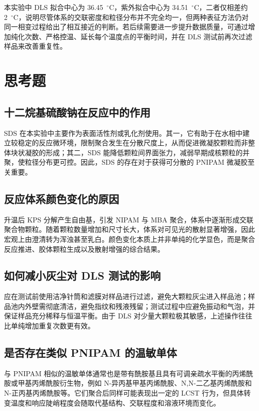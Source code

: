 \documentclass[a4paper]{article}
\begin{document}
本实验中 DLS 拟合中心为 36.45~$^{\circ}$C，紫外拟合中心为 34.51~$^{\circ}$C，二者仅相差约 2~$^{\circ}$C，说明尽管体系的交联密度和粒径分布并不完全均一，但两种表征方法仍对同一相变过程给出了相互接近的判断。若后续需要进一步提升数据质量，可通过增加纯化次数、严格控温、延长每个温度点的平衡时间，并在 DLS 测试前再次过滤样品来改善重复性。

\section{思考题}
\vspace{-0.5em}

\subsection{十二烷基硫酸钠在反应中的作用}

SDS 在本实验中主要作为表面活性剂或乳化剂使用。其一，它有助于在水相中建立较稳定的反应微环境，限制聚合发生在分散尺度上，从而促进微凝胶颗粒而非整体块状凝胶的形成；其二，SDS 能降低颗粒间界面张力，减弱早期成核颗粒的并聚，使粒径分布更可控。因此，SDS 的存在对于获得可分散的 PNIPAM 微凝胶至关重要。

\subsection{反应体系颜色变化的原因}

升温后 KPS 分解产生自由基，引发 NIPAM 与 MBA 聚合，体系中逐渐形成交联聚合物颗粒。随着颗粒数量增加和尺寸长大，体系对可见光的散射显著增强，因此宏观上由澄清转为浑浊甚至乳白。颜色变化本质上并非单纯的化学显色，而是聚合反应推进、胶体颗粒生成以及散射增强的综合结果。

\subsection{如何减小灰尘对 DLS 测试的影响}

应在测试前使用洁净针筒和滤膜对样品进行过滤，避免大颗粒灰尘进入样品池；样品池内外壁需彻底清洁，避免指纹和残液残留；测试过程中应避免振动和气泡，并保证样品充分稀释与恒温平衡。由于 DLS 对少量大颗粒极其敏感，上述操作往往比单纯增加重复次数更有效。

\subsection{是否存在类似 PNIPAM 的温敏单体}

与 PNIPAM 相似的温敏单体通常也是带有酰胺基且具有可调亲疏水平衡的丙烯酰胺或甲基丙烯酰胺衍生物，例如 N-异丙基甲基丙烯酰胺、N,N-二乙基丙烯酰胺和 N-正丙基丙烯酰胺等。它们聚合后同样可能表现出一定的 LCST 行为，但具体转变温度和响应陡峭程度会随取代基结构、交联程度和溶液环境而变化。
\end{document}
